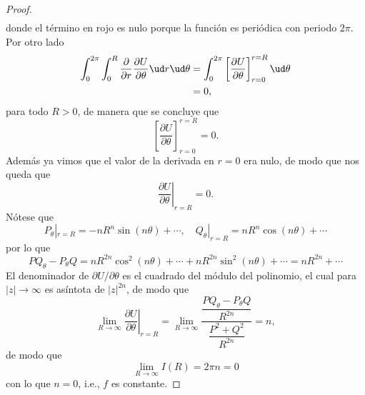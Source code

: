 \begin{proof}
\begin{align*}
	\end{align*}
	donde el término en rojo es nulo porque la función es periódica con periodo $2\pi$.
	\\
	Por otro lado
	\begin{align*}
		\int_0^{2\pi}\int_0^R \frac{\partial}{\partial r}\frac{\partial U}{\partial \theta} \ud r\ud\theta
		&= \int_0^{2\pi} \left[ \frac{\partial U}{\partial \theta} \right]_{r=0}^{r=R} \ud\theta \\
		&= 0,
	\end{align*}
	para todo $R > 0$, de manera que se concluye que
	$$ \left[ \frac{\partial U}{\partial \theta} \right]_{r=0}^{r=R} = 0. $$
	Además ya vimos que el valor de la derivada en $r=0$ era nulo, de modo que nos queda que
	$$ \left. \frac{\partial U}{\partial \theta} \right|_{r=R} = 0. $$
	Nótese que
	$$ P_\theta |_{r=R} = -nR^n\sin(n\theta) + \cdots, \quad Q_\theta|_{r=R} = nR^n\cos(n\theta) + \cdots $$
	por lo que
	$$ PQ_\theta - P_\theta Q = nR^{2n}\cos^2(n\theta) + \cdots + nR^{2n}\sin^2(n\theta) + \cdots = nR^{2n} + \cdots $$
	El denominador de $\partial U/\partial\theta$ es el cuadrado del módulo del polinomio, el cual para $|z|\to\infty$ es asíntota de $|z|^{2n}$, de modo que
	$$ \lim_{R\to\infty} \left. \frac{\partial U}{\partial \theta} \right|_{r=R} = \lim_{R\to\infty} \frac{ \dfrac{PQ_\theta - P_\theta Q}{R^{2n}} }{ \dfrac{P^2 + Q^2}{R^{2n}} } = n, $$
	de modo que
	$$ \lim_{R\to\infty} I(R) = 2\pi n = 0 $$
	con lo que $n = 0$, i.e., $f$ es constante.
\end{proof}

